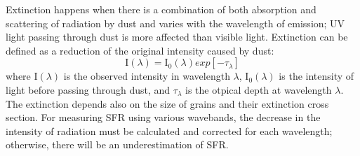 Extinction happens when there is a combination of both absorption and scattering of radiation by dust and varies with the wavelength of emission; UV light passing through dust is more affected than visible light.
Extinction can be defined as a reduction of the original intensity caused by dust:
\begin{equation}
\label{equ: extinction}
{\mathrm I}(\lambda) = {\mathrm I}_0(\lambda)exp[-\tau_{\lambda}]
\end{equation}
where I$(\lambda)$ is the observed intensity in wavelength $\lambda$, I$_0(\lambda)$ is the intensity of light before passing through dust, and $\tau_{\lambda}$ is the otpical depth at wavelength $\lambda$.
The extinction depends also on the size of grains and their extinction cross section.
For measuring SFR using various wavebands, 
the decrease in the intensity of radiation must be calculated and corrected for each wavelength; otherwise, there will be an underestimation of SFR. 




